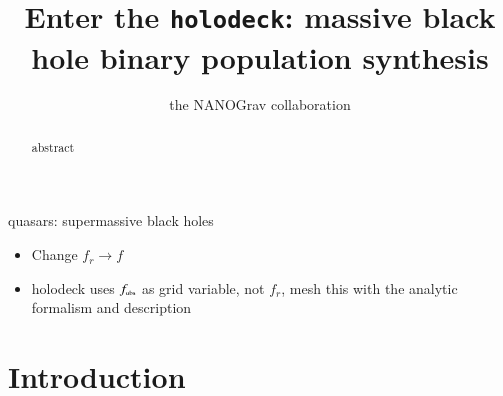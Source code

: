 \documentclass[useAMS, usenatbib]{src/mnras}
\title[holodeck: MBHB populations]{Enter the \texttt{holodeck}: massive black hole binary population synthesis}
\author[NANOGrav]{the NANOGrav collaboration}
\begin{document}
\maketitle

\begin{abstract}
    abstract
\end{abstract}

\begin{keywords}
    quasars: supermassive black holes
\end{keywords}



\begin{itemize}
    \item Change $f_r \rightarrow f$
    \item holodeck uses $f_\trt{obs}$ as grid variable, not $f_r$, mesh this with the analytic formalism and description
\end{itemize}


\section{Introduction}
    \label{sec:intro}
\end{document}
